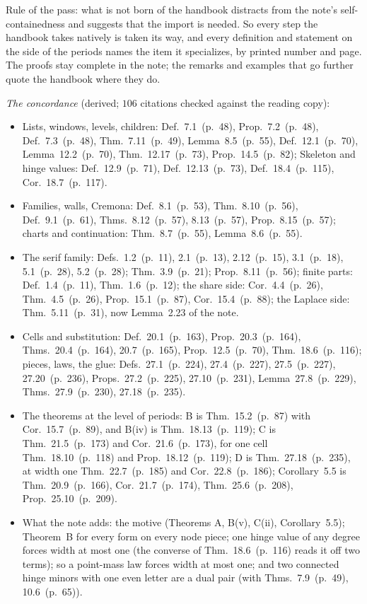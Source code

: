 \documentclass[11pt]{article}
\newcommand{\hb}[2]{#1~(p.~#2)}   %
\theoremstyle{plain}
\theoremstyle{remark}
\begin{document}
Rule of the pass: what is not born of the handbook distracts from the note's self-containedness and suggests that the import is needed. So every step the handbook takes natively is taken its way, and every definition and statement on the side of the periods names the item it specializes, by printed number and page. The proofs stay complete in the note; the remarks and examples that go further quote the handbook where they do.

\emph{The concordance} (derived; $106$ citations checked against the reading copy):
{\sloppy
\begin{itemize}
\item Lists, windows, levels, children: Def.~\hb{7.1}{48}, Prop.~\hb{7.2}{48}, Def.~\hb{7.3}{48}, Thm.~\hb{7.11}{49}, Lemma~\hb{8.5}{55}, Def.~\hb{12.1}{70}, Lemma~\hb{12.2}{70}, Thm.~\hb{12.17}{73}, Prop.~\hb{14.5}{82}; Skeleton and hinge values: Def.~\hb{12.9}{71}, Def.~\hb{12.13}{73}, Def.~\hb{18.4}{115}, Cor.~\hb{18.7}{117}.
\item Families, walls, Cremona: Def.~\hb{8.1}{53}, Thm.~\hb{8.10}{56}, Def.~\hb{9.1}{61}, Thms.~\hb{8.12}{57}, \hb{8.13}{57}, Prop.~\hb{8.15}{57}; charts and continuation: Thm.~\hb{8.7}{55}, Lemma~\hb{8.6}{55}.
\item The serif family: Defs.~\hb{1.2}{11}, \hb{2.1}{13}, \hb{2.12}{15}, \hb{3.1}{18}, \hb{5.1}{28}, \hb{5.2}{28}; Thm.~\hb{3.9}{21}; Prop.~\hb{8.11}{56}; finite parts: Def.~\hb{1.4}{11}, Thm.~\hb{1.6}{12}; the share side: Cor.~\hb{4.4}{26}, Thm.~\hb{4.5}{26}, Prop.~\hb{15.1}{87}, Cor.~\hb{15.4}{88}; the Laplace side: Thm.~\hb{5.11}{31}, now Lemma~2.23 of the note.
\item Cells and substitution: Def.~\hb{20.1}{163}, Prop.~\hb{20.3}{164}, Thms.~\hb{20.4}{164}, \hb{20.7}{165}, Prop.~\hb{12.5}{70}, Thm.~\hb{18.6}{116}; pieces, laws, the glue: Defs.~\hb{27.1}{224}, \hb{27.4}{227}, \hb{27.5}{227}, \hb{27.20}{236}, Props.~\hb{27.2}{225}, \hb{27.10}{231}, Lemma~\hb{27.8}{229}, Thms.~\hb{27.9}{230}, \hb{27.18}{235}.
\item The theorems at the level of periods: B is Thm.~\hb{15.2}{87} with Cor.~\hb{15.7}{89}, and B(iv) is Thm.~\hb{18.13}{119}; C is Thm.~\hb{21.5}{173} and Cor.~\hb{21.6}{173}, for one cell Thm.~\hb{18.10}{118} and Prop.~\hb{18.12}{119}; D is Thm.~\hb{27.18}{235}, at width one Thm.~\hb{22.7}{185} and Cor.~\hb{22.8}{186}; Corollary~5.5 is Thm.~\hb{20.9}{166}, Cor.~\hb{21.7}{174}, Thm.~\hb{25.6}{208}, Prop.~\hb{25.10}{209}.
\item What the note adds: the motive (Theorems A, B(v), C(ii), Corollary~5.5); Theorem~B for every form on every node piece; one hinge value of any degree forces width at most one (the converse of Thm.~\hb{18.6}{116} reads it off two terms); so a point-mass law forces width at most one; and two connected hinge minors with one even letter are a dual pair (with Thms.~\hb{7.9}{49}, \hb{10.6}{65}).
\end{itemize}
}
\end{document}
